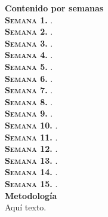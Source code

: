 \documentclass[letterpaper,10pt,onecolumn]{article}
\begin{document}
\noindent\textbf{\large {} \quad Contenido por semanas}\\[-0.2cm]


\noindent\normalsize \textbf{\textsc{Semana 1.}} .\\[-0.3cm]

\noindent\textbf{\textsc{Semana 2.}} .\\[-0.3cm]

\noindent\textbf{\textsc{Semana 3.}} .\\[-0.3cm]

\noindent\textbf{\textsc{Semana 4.}} .\\[-0.3cm]

\noindent\textbf{\textsc{Semana 5.}} .\\[-0.3cm]

\noindent\textbf{\textsc{Semana 6.}} .\\[-0.3cm]

\noindent\textbf{\textsc{Semana 7.}} .\\[-0.3cm]

\noindent\textbf{\textsc{Semana 8.}} .\\[-0.3cm]

\noindent\textbf{\textsc{Semana 9.}} .\\[-0.3cm]

\noindent\textbf{\textsc{Semana 10.}} .\\[-0.3cm]

\noindent\textbf{\textsc{Semana 11.}} .\\[-0.3cm]

\noindent\textbf{\textsc{Semana 12.}} .\\[-0.3cm]

\noindent\textbf{\textsc{Semana 13.}} .\\[-0.3cm]

\noindent\textbf{\textsc{Semana 14.}} .\\[-0.3cm]

\noindent\textbf{\textsc{Semana 15.}} .\\[0.1cm]

\noindent\textbf{\large {} \quad Metodolog\'ia}\\[-0.2cm]


\noindent\normalsize Aqu\'i texto.\\[0.1cm]
\end{document}

